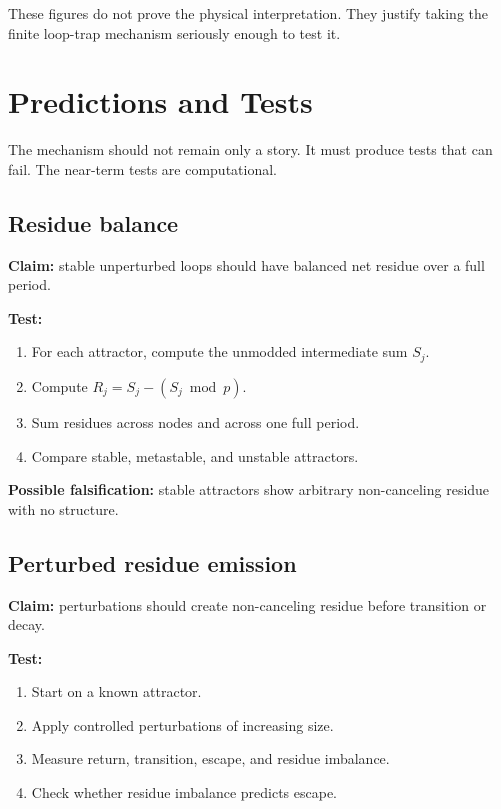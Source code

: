 \documentclass[11pt,a4paper]{article}
\begin{document}
These figures do not prove the physical interpretation. They justify taking
the finite loop-trap mechanism seriously enough to test it.

\section{Predictions and Tests}

The mechanism should not remain only a story. It must produce tests that can
fail. The near-term tests are computational.

\subsection{Residue balance}

\textbf{Claim:} stable unperturbed loops should have balanced net residue over
a full period.

\textbf{Test:}

\begin{enumerate}
\item For each attractor, compute the unmodded intermediate sum $S_j$.
\item Compute $R_j=S_j-(S_j \bmod p)$.
\item Sum residues across nodes and across one full period.
\item Compare stable, metastable, and unstable attractors.
\end{enumerate}

\textbf{Possible falsification:} stable attractors show arbitrary
non-canceling residue with no structure.

\subsection{Perturbed residue emission}

\textbf{Claim:} perturbations should create non-canceling residue before
transition or decay.

\textbf{Test:}

\begin{enumerate}
\item Start on a known attractor.
\item Apply controlled perturbations of increasing size.
\item Measure return, transition, escape, and residue imbalance.
\item Check whether residue imbalance predicts escape.
\end{enumerate}
\end{document}
